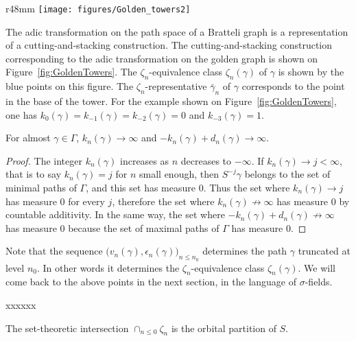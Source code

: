 \documentclass[12pt,a4paper]{article}
\begin{document}
\begin{wrapfigure}{r}{48mm}
   \centering
   	\texttt{[image: figures/Golden\_towers2]}
   \caption{Golden towers}
   \label{fig:GoldenTowers}
\end{wrapfigure}
The adic transformation on the path space of a Bratteli graph is 
a representation of a cutting-and-stacking construction. 
The cutting-and-stacking construction corresponding to 
the adic transformation on the golden graph is shown on
Figure~\ref{fig:GoldenTowers}. 
The $\zeta_n$-equivalence class $\zeta_n(\gamma)$ of 
$\gamma$ is shown by the blue points on this figure. 
The $\zeta_n$-representative $\bar\gamma_n$ of $\gamma$ 
corresponds to the point in the base of the tower. 
For the example shown on Figure~\ref{fig:GoldenTowers}, 
one has $k_0(\gamma)=k_{-1}(\gamma)=k_{-2}(\gamma)=0$ 
and $k_{-3}(\gamma)=1$. 




\begin{lemma}\label{lemma:infinitelimits}
For almost $\gamma \in \Gamma$, 
$k_n(\gamma) \to \infty$ and $-k_n(\gamma)+d_n(\gamma) \to \infty$.
\end{lemma}

\begin{proof}
The integer $k_n(\gamma)$ increases as $n$ decreases to $-\infty$. 
If $k_n(\gamma) \to j < \infty$, that is to say $k_n(\gamma)=j$ for $n$ small 
enough, then $S^{-j}\gamma$ belongs to the set of minimal paths 
of $\Gamma$, and this set has measure $0$. 
Thus the set where $k_n(\gamma) \to j$ has measure $0$ for every $j$, 
therefore the set where $k_n(\gamma) \not\to \infty$ has measure $0$ 
by countable additivity. 
In the same way, the set where $-k_n(\gamma)+d_n(\gamma) \not\to \infty$ 
has measure $0$ because the set of maximal paths of $\Gamma$ has measure $0$.
\end{proof}

 
Note that the sequence $\bigl(v_n(\gamma), \epsilon_n(\gamma)\bigr)_{n \leq n_0}$  
 determines the path $\gamma$ truncated at level $n_0$. 
In other words it determines the $\zeta_{n}$-equivalence class  
$\zeta_n(\gamma)$. 
We will come back to the above points in the next section, in the 
language of $\sigma$-fields. 

\bigskip 

xxxxxx

\begin{lemma}
The set-theoretic intersection $\cap_{n \leq 0} \zeta_n$ is the orbital partition of $S$. 
\end{lemma}
\end{document}
